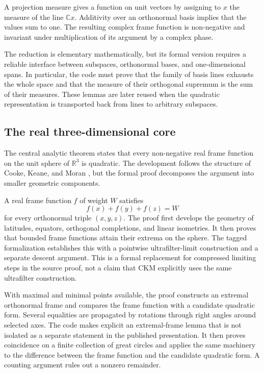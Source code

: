 \documentclass[pdflatex,sn-mathphys-num]{sn-jnl}
\theoremstyle{thmstyleone}
\theoremstyle{thmstylethree}
\begin{document}
A projection measure gives a function on unit vectors by assigning to \(x\) the measure of the line \(\mathbb Cx\). Additivity over an orthonormal basis implies that the values sum to one. The resulting complex frame function is non-negative and invariant under multiplication of its argument by a complex phase.

The reduction is elementary mathematically, but its formal version requires a reliable interface between subspaces, orthonormal bases, and one-dimensional spans. In particular, the code must prove that the family of basis lines exhausts the whole space and that the measure of their orthogonal supremum is the sum of their measures. These lemmas are later reused when the quadratic representation is transported back from lines to arbitrary subspaces.

\subsection{The real three-dimensional core}\label{the-real-three-dimensional-core}

The central analytic theorem states that every non-negative real frame function on the unit sphere of \(\mathbb R^3\) is quadratic. The development follows the structure of Cooke, Keane, and Moran \cite{cooke1985}, but the formal proof decomposes the argument into smaller geometric components.

A real frame function \(f\) of weight \(W\) satisfies \[f(x)+f(y)+f(z)=W\] for every orthonormal triple \((x,y,z)\). The proof first develops the geometry of latitudes, equators, orthogonal completions, and linear isometries. It then proves that bounded frame functions attain their extrema on the sphere. The tagged formalization establishes this with a pointwise ultrafilter-limit construction and a separate descent argument. This is a formal replacement for compressed limiting steps in the source proof, not a claim that CKM explicitly uses the same ultrafilter construction.

With maximal and minimal points available, the proof constructs an extremal orthonormal frame and compares the frame function with a candidate quadratic form. Several equalities are propagated by rotations through right angles around selected axes. The code makes explicit an extremal-frame lemma that is not isolated as a separate statement in the published presentation. It then proves coincidence on a finite collection of great circles and applies the same machinery to the difference between the frame function and the candidate quadratic form. A counting argument rules out a nonzero remainder.
\end{document}
